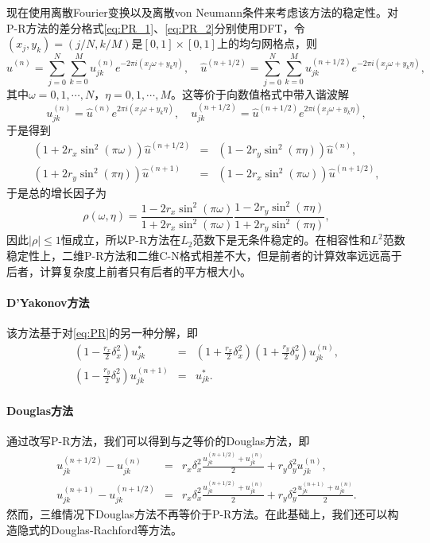 \documentclass[a4paper,10pt]{ctexart}
\begin{document}
现在使用离散Fourier变换以及离散von Neumann条件来考虑该方法的稳定性。对P-R方法的差分格式\eqref{eq:PR_1}、\eqref{eq:PR_2}分别使用DFT，令$ (x_j,y_k) = (j / N, k / M) $是$ [0,1]\times [0,1] $上的均匀网格点，则
\[
    \hat{u}^{(n)} = \sum_{j=0}^{N}\sum_{k=0}^{M} u^{(n)}_{jk}e^{-2\pi i(x_j\omega+y_k\eta)},\quad \hat{u}^{(n+1/2)} = \sum_{j=0}^{N}\sum_{k=0}^{M} u^{(n+1/2)}_{jk}e^{-2\pi i(x_j\omega+y_k\eta)},
\]
其中$ \omega = 0,1,\cdots ,N $，$ \eta=0,1,\cdots ,M $。这等价于向数值格式中带入谐波解
\[
    u^{(n)}_{jk} = \hat{u}^{(n)}e^{2\pi i(x_j\omega+y_k\eta)},\quad u^{(n+1/2)}_{jk} = \hat{u}^{(n+1/2)}e^{2\pi i(x_j\omega+y_k\eta)},
\]
于是得到
\begin{eqnarray}
    (1+2r_x \sin^2(\pi \omega))\hat{u}^{(n+1 / 2)} &=& (1-2r_y \sin^2(\pi \eta))\hat{u}^{(n)},\\
    (1+2r_y \sin^2(\pi \eta))\hat{u}^{(n+1)} &=& (1-2r_x \sin^2(\pi \omega))\hat{u}^{(n+1 / 2)},
\end{eqnarray}
于是总的增长因子为
\[
    \rho(\omega,\eta) = \frac{1-2r_x \sin^2(\pi \omega)}{1+2r_x \sin^2(\pi \omega)}\frac{1-2r_y \sin^2(\pi \eta)}{1+2r_y \sin^2(\pi \eta)},
\]
因此$ |\rho|\leqslant 1 $恒成立，所以P-R方法在$ L_2 $范数下是无条件稳定的。在相容性和$ L^2 $范数稳定性上，二维P-R方法和二维C-N格式相差不大，但是前者的计算效率远远高于后者，计算复杂度上前者只有后者的平方根大小。

\paragraph*{D'Yakonov方法}
该方法基于对\eqref{eq:PR}的另一种分解，即
\begin{eqnarray}
    \left( 1-\frac{r_x}{2}\delta_x^2 \right) u^{*}_{jk} &=& \left( 1+\frac{r_x}{2}\delta_x^2 \right)\left( 1+\frac{r_y}{2}\delta_y^2 \right) u^{(n)}_{jk},\\
    \left( 1-\frac{r_y}{2}\delta_y^2 \right) u^{(n+1)}_{jk} &=& u^{*}_{jk}.
\end{eqnarray}

\paragraph*{Douglas方法}
通过改写P-R方法，我们可以得到与之等价的Douglas方法，即
\begin{eqnarray}
    u^{(n+1/2)}_{jk} - u^{(n)}_{jk} &=& r_x \delta_x^2\frac{u^{(n+1 / 2)}_{jk}+u^{(n)}_{jk}}{2}+r_y \delta_y^2 u^{(n)}_{jk},\\
    u^{(n+1)}_{jk} - u^{(n+1/2)}_{jk} &=& r_x \delta_x^2 \frac{u^{(n+1 / 2)}_{jk}+u^{(n)}_{jk}}{2}+r_y \delta_y^2\frac{u^{(n+1)}_{jk}+u^{(n)}_{jk}}{2}.
\end{eqnarray}
然而，三维情况下Douglas方法不再等价于P-R方法。在此基础上，我们还可以构造隐式的Douglas-Rachford等方法。
\end{document}
